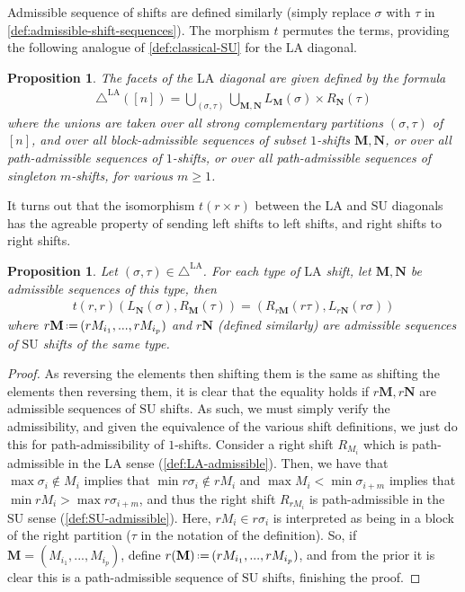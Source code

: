 \documentclass{amsart}
\newtheorem{proposition}[theorem]{Proposition}
\theoremstyle{definition}
\renewcommand{\b}[1]{{\boldsymbol{#1}}} %
\newcommand{\eqdef}{\mbox{\,\raisebox{0.2ex}{\scriptsize\ensuremath{\mathrm:}}\ensuremath{=}\,}} %
\renewcommand{\b}[1]{\boldsymbol{#1}} %
\newcommand{\SU}{\mathrm{SU}}
\newcommand{\LA}{\mathrm{LA}}
\newcommand{\LAD}{\triangle^{\mathrm{LA}}}
\begin{document}
Admissible sequence of shifts are defined similarly (simply replace $\sigma$ with $\tau$ in \cref{def:admissible-shift-sequences}).
The morphism $t$ permutes the terms, providing the following analogue of \cref{def:classical-SU} for the $\LA$ diagonal. 

\begin{proposition}
\label{def:classical-LA}
The facets of the $\LA$ diagonal are given defined by the formula
\begin{align*}
\LAD([n]) = \bigcup_{(\sigma,\tau)} \bigcup_{\mathbf{M}, \mathbf{N}} L_\mathbf{M}(\sigma)\times R_\mathbf{N}(\tau)
\end{align*}
where the unions are taken over all strong complementary partitions $(\sigma, \tau)$ of $[n]$, and over all block-admissible sequences of subset $1$-shifts $\b{M},\b{N}$, or over all path-admissible sequences of $1$-shifts, or over all path-admissible sequences of singleton $m$-shifts, for various $m\geq 1$.
\end{proposition}

It turns out that the isomorphism $t(r \times r)$ between the $\LA$ and $\SU$ diagonals has the agreable property of sending left shifts to left shifts, and right shifts to right shifts. 

\begin{proposition} 
\label{prop:trr is an isomorphism of shifts}
Let $(\sigma,\tau) \in \LAD$.
For each type of $\LA$ shift, let $\b{M},\b{N}$ be admissible sequences of this type, then 
\begin{align*}
	t(r,r)(L_\mathbf{N}(\sigma), R_\mathbf{M}(\tau)) = (R_{r\mathbf{M}}(r\tau), L_{r\mathbf{N}}(r\sigma))
\end{align*}
where $r\mathbf{M} \eqdef (rM_{i_1},...,rM_{i_p})$ and $r\mathbf{N}$ (defined similarly) are admissible sequences of $\SU$ shifts of the same type.
\end{proposition}
\begin{proof}
As reversing the elements then shifting them is the same as shifting the elements then reversing them,
it is clear that the equality holds if $r\mathbf{M},r\mathbf{N}$ are admissible sequences of $\SU$ shifts.
As such, we must simply verify the admissibility, and given the equivalence of the various shift definitions, we just do this for path-admissibility of $1$-shifts.
Consider a right shift $R_{M_i}$ which is path-admissible in the $\LA$ sense (\cref{def:LA-admissible}). 
Then, we have that $\max \sigma_i \notin M_i$ implies that $ \min r\sigma_i \not \in r M_i$ and $\max M_i < \min \sigma_{i+m}$  implies that $\min r M_i > \max r \sigma_{i+m}$, and thus the right shift $R_{rM_i}$ is path-admissible in the $\SU$ sense (\cref{def:SU-admissible}).
Here, $rM_i \in r\sigma_i$ is interpreted as being in a block of the right partition ($\tau$ in the notation of the definition).
So, if $\mathbf{M} = (M_{i_1},...,M_{i_p})$, define $r(\mathbf{M}) \eqdef (rM_{i_1},...,rM_{i_p})$, and from the prior it is clear this is a path-admissible sequence of $\SU$ shifts, finishing the proof.
\end{proof}
\end{document}
